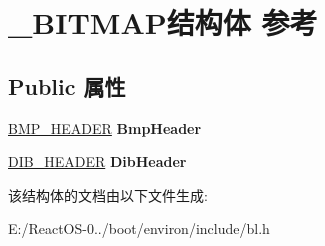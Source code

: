 \hypertarget{struct___b_i_t_m_a_p}{}\section{\+\_\+\+B\+I\+T\+M\+A\+P结构体 参考}
\label{struct___b_i_t_m_a_p}
\subsection*{Public 属性}
\begin{DoxyCompactItemize}
\item 
\mbox{\label{struct___b_i_t_m_a_p_acca15088c97d3341879c1e81e92dff15}} 
\hyperlink{struct___b_m_p___h_e_a_d_e_r}{B\+M\+P\+\_\+\+H\+E\+A\+D\+ER} {\bfseries Bmp\+Header}
\item 
\mbox{\label{struct___b_i_t_m_a_p_a1985ffe82ca5f903712fb67bde0ece21}} 
\hyperlink{struct___d_i_b___h_e_a_d_e_r}{D\+I\+B\+\_\+\+H\+E\+A\+D\+ER} {\bfseries Dib\+Header}
\end{DoxyCompactItemize}


该结构体的文档由以下文件生成\+:\begin{DoxyCompactItemize}
\item 
E\+:/\+React\+O\+S-\/0../boot/environ/include/bl.\+h\end{DoxyCompactItemize}
